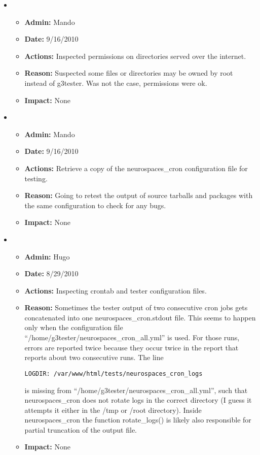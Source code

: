 \documentclass[12pt]{article}
\begin{document}
\begin{itemize}

\item
\begin{itemize}
\item[] {\bf Admin:} Mando
\item[] {\bf Date:} 9/16/2010 
\item[] {\bf Actions:} Inspected permissions on directories served over the internet.
\item[] {\bf Reason:} Suspected some files or directories may be owned by root instead of g3tester. Was not the case, permissions were ok.
\item[] {\bf Impact:} None
\end{itemize}
	
\item 
\begin{itemize}
\item[] {\bf Admin:} Mando
\item[] {\bf Date:} 9/16/2010 
\item[] {\bf Actions:} Retrieve a copy of the neurospaces\_cron configuration file for testing.
\item[] {\bf Reason:} Going to retest the output of source tarballs and packages with the same configuration to check for any bugs.
\item[] {\bf Impact:} None
\end{itemize}
	
\item 
\begin{itemize}
\item[] {\bf Admin:} Hugo
\item[] {\bf Date:} 8/29/2010 
\item[] {\bf Actions:} Inspecting crontab and tester configuration
  files.
\item[] {\bf Reason:} Sometimes the tester output of two consecutive
  cron jobs gets concatenated into one neurospaces\_cron.stdout file.
  This seems to happen only when the configuration file
  ``/home/g3tester/neurospaces\_cron\_all.yml'' is used.  For those
  runs, errors are reported twice because they occur twice in the
  report that reports about two consecutive runs.
  The line
\begin{verbatim}
LOGDIR: /var/www/html/tests/neurospaces_cron_logs
\end{verbatim}
  is missing from ``/home/g3tester/neurospaces\_cron\_all.yml'', such
  that neurospaces\_cron does not rotate logs in the correct directory
  (I guess it attempts it either in the /tmp or /root directory).
  Inside neurospaces\_cron the function rotate\_logs() is likely also
  responsible for partial truncation of the output file.
\item[] {\bf Impact:} None
\end{itemize}


\end{itemize}
\end{document}
